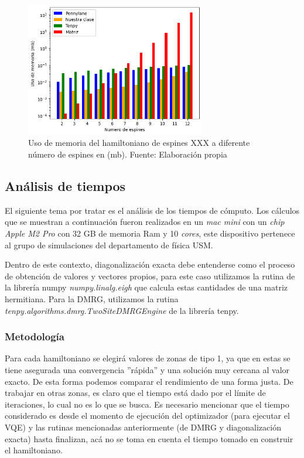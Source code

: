 \begin{figure}[H]
\centering
\includegraphics[width=0.7\textwidth]{figures/S4/spins/usomemoriahei.png}
\caption{\label{fig:23} Uso de memoria del hamiltoniano de espines XXX a diferente número de espines en (mb). Fuente: Elaboración propia}
\end{figure}

\subsection{Análisis de tiempos}
El siguiente tema por tratar es el análisis de los tiempos de cómputo. Los cálculos que se muestran a continuación fueron realizados en un \textit{mac mini} con un \textit{chip Apple M2 Pro} con 32 GB de memoria Ram y 10 \textit{cores}, este dispositivo pertenece al grupo de simulaciones del departamento de física USM.

Dentro de este contexto, diagonalización exacta debe entenderse como el proceso de obtención de valores y vectores propios, para este caso utilizamos la rutina de la librería numpy \textit{numpy.linalg.eigh} que calcula estas cantidades de una matriz hermitiana. Para la DMRG, utilizamos la rutina \textit{tenpy.algorithms.dmrg.TwoSiteDMRGEngine} de la librería tenpy.


\subsubsection{Metodología}
Para cada hamiltoniano se elegirá valores de zonas de tipo 1, ya que en estas se tiene asegurada una convergencia ''rápida'' y una solución muy cercana al valor exacto. De esta forma podemos comparar el rendimiento de una forma justa. De trabajar en otras zonas, es claro que el tiempo está dado por el límite de iteraciones, lo cual no es lo que se busca. Es necesario mencionar que el tiempo considerado es desde el momento de ejecución del optimizador (para ejecutar el VQE) y las rutinas mencionadas anteriormente (de DMRG y diagonalización exacta) hasta finalizan, acá no se toma en cuenta el tiempo tomado en construir el hamiltoniano.

